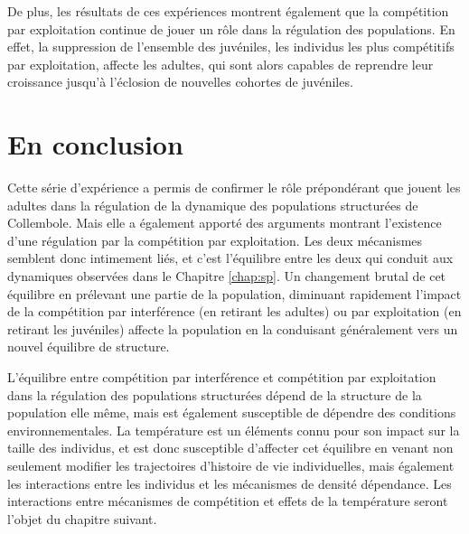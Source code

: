 De plus, les résultats de ces expériences montrent également que la compétition
par exploitation continue de jouer un rôle dans la régulation des populations.
En effet, la suppression de l'ensemble des juvéniles, les individus les plus
compétitifs par exploitation, affecte les adultes, qui sont alors capables de
reprendre leur croissance jusqu'à l'éclosion de nouvelles cohortes de juvéniles.

\section{En conclusion}

Cette série d'expérience a permis de confirmer le rôle
prépondérant que jouent les adultes dans la régulation de la dynamique des
populations structurées de Collembole. Mais elle a également apporté des
arguments montrant l'existence d'une régulation par la compétition par
exploitation. Les deux mécanismes semblent donc intimement liés, et c'est
l'équilibre entre les deux qui conduit aux dynamiques observées dans le Chapitre
\ref{chap:sp}. Un changement brutal de cet équilibre en prélevant une partie de
la population, diminuant rapidement l'impact de la compétition par interférence
(en retirant les adultes) ou par exploitation (en retirant les juvéniles)
affecte la population en la conduisant généralement vers un nouvel équilibre de
structure. 

L'équilibre entre compétition par interférence et compétition par exploitation
dans la régulation des populations structurées dépend de la structure de la
population elle même, mais est également susceptible de dépendre des conditions
environnementales. La température est un éléments connu pour son impact sur la
taille des individus, et est donc susceptible d'affecter cet équilibre en venant
non seulement modifier les trajectoires d'histoire de vie individuelles, mais
également les interactions entre les individus et les mécanismes de densité
dépendance. Les interactions entre mécanismes de compétition et effets
de la température seront l'objet du chapitre suivant. 

